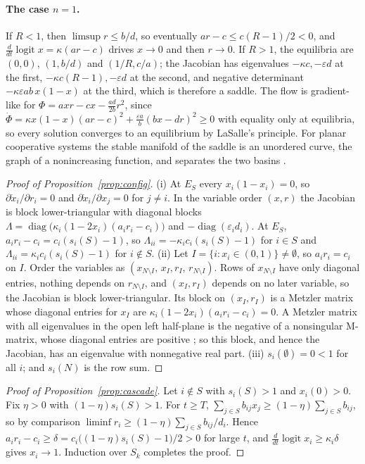 \documentclass[letterpaper]{article} %
\theoremstyle{definition}
\begin{document}
\paragraph{The case $n=1$.} If $R<1$, then $\limsup r\le b/d$, so eventually $ar-c\le c(R-1)/2<0$, and $\tfrac{d}{dt}\operatorname{logit}x=\kappa(ar-c)$ drives $x\to0$ and then $r\to0$. If $R>1$, the equilibria are $(0,0)$, $(1,b/d)$ and $(1/R,c/a)$; the Jacobian has eigenvalues $-\kappa c,-\varepsilon d$ at the first, $-\kappa c(R-1),-\varepsilon d$ at the second, and negative determinant $-\kappa\varepsilon ab\,x(1-x)$ at the third, which is therefore a saddle. The flow is gradient-like for $\Phi=axr-cx-\tfrac{ad}{2b}r^2$, since $\dot\Phi=\kappa x(1-x)(ar-c)^2+\tfrac{\varepsilon a}{b}(bx-dr)^2\ge0$ with equality only at equilibria, so every solution converges to an equilibrium by LaSalle's principle. For planar cooperative systems the stable manifold of the saddle is an unordered curve, the graph of a nonincreasing function, and separates the two basins \citep{hirsch1985,smith1995}.

\begin{proof}[Proof of Proposition~\ref{prop:config}]
(i) At $E_S$ every $x_i(1-x_i)=0$, so $\partial\dot x_i/\partial r_i=0$ and $\partial\dot x_i/\partial x_j=0$ for $j\neq i$. In the variable order $(x,r)$ the Jacobian is block lower-triangular with diagonal blocks $\Lambda=\operatorname{diag}\big(\kappa_i(1-2x_i)(a_ir_i-c_i)\big)$ and $-\operatorname{diag}(\varepsilon_id_i)$. At $E_S$, $a_ir_i-c_i=c_i(s_i(S)-1)$, so $\Lambda_{ii}=-\kappa_ic_i(s_i(S)-1)$ for $i\in S$ and $\Lambda_{ii}=\kappa_ic_i(s_i(S)-1)$ for $i\notin S$. (ii) Let $I=\{i:x_i\in(0,1)\}\neq\emptyset$, so $a_ir_i=c_i$ on $I$. Order the variables as $(x_{N\setminus I},\,x_I,r_I,\,r_{N\setminus I})$. Rows of $x_{N\setminus I}$ have only diagonal entries, nothing depends on $r_{N\setminus I}$, and $(x_I,r_I)$ depends on no later variable, so the Jacobian is block lower-triangular. Its block on $(x_I,r_I)$ is a Metzler matrix whose diagonal entries for $x_I$ are $\kappa_i(1-2x_i)(a_ir_i-c_i)=0$. A Metzler matrix with all eigenvalues in the open left half-plane is the negative of a nonsingular M-matrix, whose diagonal entries are positive \citep{smith1995}; so this block, and hence the Jacobian, has an eigenvalue with nonnegative real part. (iii) $s_i(\emptyset)=0<1$ for all $i$; and $s_i(N)$ is the row sum.
\end{proof}

\begin{proof}[Proof of Proposition~\ref{prop:cascade}]
Let $i\notin S$ with $s_i(S)>1$ and $x_i(0)>0$. Fix $\eta>0$ with $(1-\eta)s_i(S)>1$. For $t\ge T$, $\sum_{j\in S}b_{ij}x_j\ge(1-\eta)\sum_{j\in S}b_{ij}$, so by comparison $\liminf r_i\ge(1-\eta)\sum_{j\in S}b_{ij}/d_i$. Hence $a_ir_i-c_i\ge\delta=c_i\big((1-\eta)s_i(S)-1\big)/2>0$ for large $t$, and $\tfrac{d}{dt}\operatorname{logit}x_i\ge\kappa_i\delta$ gives $x_i\to1$. Induction over $S_k$ completes the proof.
\end{proof}
\end{document}
